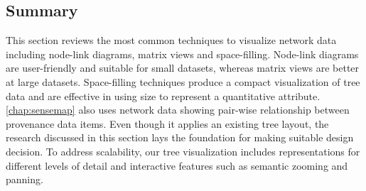 
\subsection{Summary}
This section reviews the most common techniques to visualize network data including node-link diagrams, matrix views and space-filling. Node-link diagrams are user-friendly and suitable for small datasets, whereas matrix views are better at large datasets. Space-filling techniques produce a compact visualization of tree data and are effective in using size to represent a quantitative attribute. \autoref{chap:sensemap} also uses network data showing pair-wise relationship between provenance data items. Even though it applies an existing tree layout, the research discussed in this section lays the foundation for making suitable design decision. To address scalability, our tree visualization includes representations for different levels of detail and interactive features such as semantic zooming and panning.